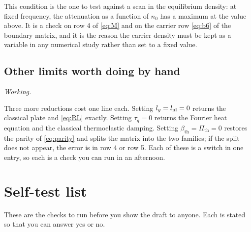 \documentclass[11pt,a4paper]{article}
\newif\ifshowworked \showworkedtrue
\newenvironment{worked}{\ifshowworked\par\smallskip\noindent\textit{Working.}\par\else\setbox0\vbox\bgroup\fi}{\ifshowworked\par\smallskip\else\egroup\fi}
\newcommand{\bth}{\beta_{\mathrm{th}}}
\newcommand{\Pth}{\Pi_{\mathrm{th}}}
\begin{document}
\noindent This condition is the one to test against a scan in the equilibrium density: at fixed frequency,
the attenuation as a function of $n_0$ has a maximum at the value above. It is a check on row 4 of
\eqref{eq:M} and on the carrier row \eqref{eq:b6} of the boundary matrix, and it is the reason the carrier
density must be kept as a variable in any numerical study rather than set to a fixed value.

\subsection{Other limits worth doing by hand}

\begin{worked}
Three more reductions cost one line each. Setting $l_g=l_{\rm nl}=0$ returns the classical plate and
\eqref{eq:RL} exactly. Setting $\tau_q=0$ returns the Fourier heat equation and the classical thermoelastic
damping. Setting $\bth=\Pth=0$ restores the parity of \eqref{eq:parity} and splits the matrix into the two
families; if the split does not appear, the error is in row 4 or row 5. Each of these is a switch in one
entry, so each is a check you can run in an afternoon.
\end{worked}

\section{Self-test list}\label{sec:tests}

These are the checks to run before you show the draft to anyone. Each is stated so that you can answer yes
or no.
\end{document}
